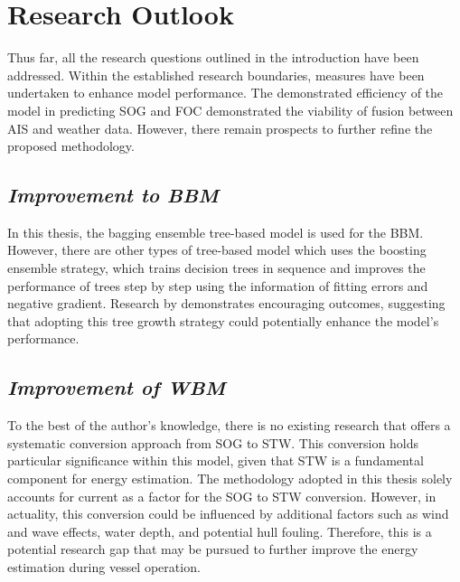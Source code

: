 \pagebreak

\section{Research Outlook}\label{sec:research_outlook}

Thus far, all the research questions outlined in the introduction have been addressed. Within the established research boundaries, measures have been undertaken to enhance model performance. The demonstrated efficiency of the model in predicting SOG and FOC demonstrated the viability of fusion between AIS and weather data. However, there remain prospects to further refine the proposed methodology.\\

\subsection*{\emph{Improvement to BBM}}

In this thesis, the bagging ensemble tree-based model is used for the BBM. However, there are other types of tree-based model which uses the boosting ensemble strategy, which trains decision trees in sequence and improves the performance of trees step by step using the information of fitting errors and negative gradient. Research by  demonstrates encouraging outcomes, suggesting that adopting this tree growth strategy could potentially enhance the model's performance.\\


\subsection*{\emph{Improvement of WBM}}

To the best of the author's knowledge, there is no existing research that offers a systematic conversion approach from SOG to STW. This conversion holds particular significance within this model, given that STW is a fundamental component for energy estimation. The methodology adopted in this thesis solely accounts for current as a factor for the SOG to STW conversion. However, in actuality, this conversion could be influenced by additional factors such as wind and wave effects, water depth, and potential hull fouling. Therefore, this is a potential research gap that may be pursued to further improve the energy estimation during vessel operation.\\ 

